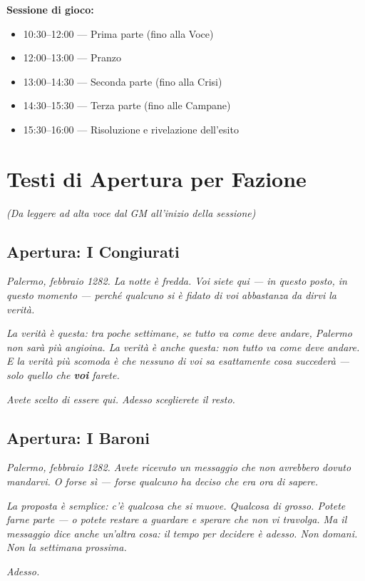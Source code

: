 \textbf{Sessione di gioco:}
\begin{itemize}[nosep]
  \item 10:30--12:00 — Prima parte (fino alla Voce)
  \item 12:00--13:00 — Pranzo
  \item 13:00--14:30 — Seconda parte (fino alla Crisi)
  \item 14:30--15:30 — Terza parte (fino alle Campane)
  \item 15:30--16:00 — Risoluzione e rivelazione dell'esito
\end{itemize}

\secsep

\section{Testi di Apertura per Fazione}
\textit{(Da leggere ad alta voce dal GM all'inizio della sessione)}

\subsection{Apertura: I Congiurati}

\begin{citbox}
\textit{Palermo, febbraio 1282. La notte è fredda. Voi siete qui —
in questo posto, in questo momento — perché qualcuno si è fidato
di voi abbastanza da dirvi la verità.}

\textit{La verità è questa: tra poche settimane, se tutto va come
deve andare, Palermo non sarà più angioina. La verità è anche
questa: non tutto va come deve andare. E la verità più scomoda
è che nessuno di voi sa esattamente cosa succederà — solo quello
che \textbf{voi} farete.}

\textit{Avete scelto di essere qui. Adesso sceglierete il resto.}
\end{citbox}

\subsection{Apertura: I Baroni}

\begin{citbox}
\textit{Palermo, febbraio 1282. Avete ricevuto un messaggio che
non avrebbero dovuto mandarvi. O forse sì — forse qualcuno
ha deciso che era ora di sapere.}

\textit{La proposta è semplice: c'è qualcosa che si muove.
Qualcosa di grosso. Potete farne parte — o potete restare
a guardare e sperare che non vi travolga. Ma il messaggio
dice anche un'altra cosa: il tempo per decidere è adesso.
Non domani. Non la settimana prossima.}

\textit{Adesso.}
\end{citbox}

